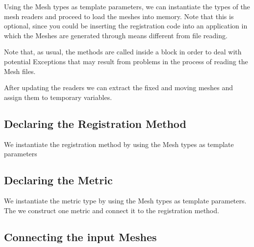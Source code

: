 \documentclass{InsightArticle}
\begin{document}
Using the Mesh types as template parameters, we can instantiate the types of
the mesh readers and proceed to load the meshes into memory. Note that this is
optional, since you could be inserting the registration code into an
application in which the Meshes are generated through means different from file
reading.

\begin{center}

\end{center}

Note that, as usual, the  methods are called inside a
 block in order to deal with potential Exceptions that may
result from problems in the process of reading the Mesh files.

After updating the readers we can extract the fixed and moving meshes and
assign them to temporary variables.

\begin{center}

\end{center}


\subsection{Declaring the Registration Method}

We instantiate the registration method by using the Mesh types as template parameters

\begin{center}

\end{center}


\subsection{Declaring the Metric}

We instantiate the metric type by using the Mesh types as template parameters.
The we construct one metric and connect it to the registration method.

\begin{center}

\end{center}

\subsection{Connecting the input Meshes}
\end{document}
